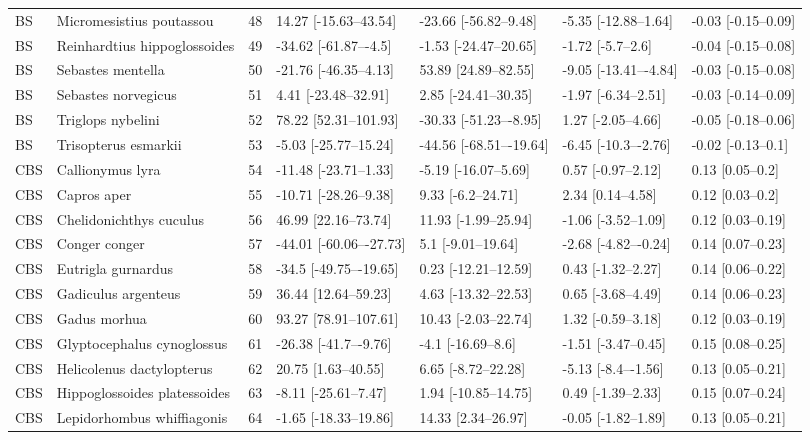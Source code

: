 \begin{longtable}[t]{lllllll}
BS & Micromesistius poutassou & 48 & 14.27 [-15.63–43.54] & -23.66 [-56.82–9.48] & -5.35 [-12.88–1.64] & -0.03 [-0.15–0.09]\\
BS & Reinhardtius hippoglossoides & 49 & -34.62 [-61.87–-4.5] & -1.53 [-24.47–20.65] & -1.72 [-5.7–2.6] & -0.04 [-0.15–0.08]\\
BS & Sebastes mentella & 50 & -21.76 [-46.35–4.13] & 53.89 [24.89–82.55] & -9.05 [-13.41–-4.84] & -0.03 [-0.15–0.08]\\
\addlinespace
BS & Sebastes norvegicus & 51 & 4.41 [-23.48–32.91] & 2.85 [-24.41–30.35] & -1.97 [-6.34–2.51] & -0.03 [-0.14–0.09]\\
BS & Triglops nybelini & 52 & 78.22 [52.31–101.93] & -30.33 [-51.23–-8.95] & 1.27 [-2.05–4.66] & -0.05 [-0.18–0.06]\\
BS & Trisopterus esmarkii & 53 & -5.03 [-25.77–15.24] & -44.56 [-68.51–-19.64] & -6.45 [-10.3–-2.76] & -0.02 [-0.13–0.1]\\
CBS & Callionymus lyra & 54 & -11.48 [-23.71–1.33] & -5.19 [-16.07–5.69] & 0.57 [-0.97–2.12] & 0.13 [0.05–0.2]\\
CBS & Capros aper & 55 & -10.71 [-28.26–9.38] & 9.33 [-6.2–24.71] & 2.34 [0.14–4.58] & 0.12 [0.03–0.2]\\
\addlinespace
CBS & Chelidonichthys cuculus & 56 & 46.99 [22.16–73.74] & 11.93 [-1.99–25.94] & -1.06 [-3.52–1.09] & 0.12 [0.03–0.19]\\
CBS & Conger conger & 57 & -44.01 [-60.06–-27.73] & 5.1 [-9.01–19.64] & -2.68 [-4.82–-0.24] & 0.14 [0.07–0.23]\\
CBS & Eutrigla gurnardus & 58 & -34.5 [-49.75–-19.65] & 0.23 [-12.21–12.59] & 0.43 [-1.32–2.27] & 0.14 [0.06–0.22]\\
CBS & Gadiculus argenteus & 59 & 36.44 [12.64–59.23] & 4.63 [-13.32–22.53] & 0.65 [-3.68–4.49] & 0.14 [0.06–0.23]\\
CBS & Gadus morhua & 60 & 93.27 [78.91–107.61] & 10.43 [-2.03–22.74] & 1.32 [-0.59–3.18] & 0.12 [0.03–0.19]\\
\addlinespace
CBS & Glyptocephalus cynoglossus & 61 & -26.38 [-41.7–-9.76] & -4.1 [-16.69–8.6] & -1.51 [-3.47–0.45] & 0.15 [0.08–0.25]\\
CBS & Helicolenus dactylopterus & 62 & 20.75 [1.63–40.55] & 6.65 [-8.72–22.28] & -5.13 [-8.4–-1.56] & 0.13 [0.05–0.21]\\
CBS & Hippoglossoides platessoides & 63 & -8.11 [-25.61–7.47] & 1.94 [-10.85–14.75] & 0.49 [-1.39–2.33] & 0.15 [0.07–0.24]\\
CBS & Lepidorhombus whiffiagonis & 64 & -1.65 [-18.33–19.86] & 14.33 [2.34–26.97] & -0.05 [-1.82–1.89] & 0.13 [0.05–0.21]\\

\end{longtable}
